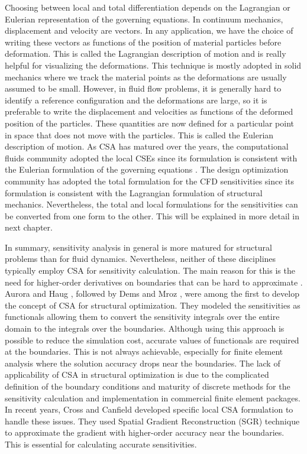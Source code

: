 Choosing between local and total differentiation depends on the Lagrangian or Eulerian representation of the governing equations. In continuum mechanics,  displacement and velocity are vectors. In any application, we have the choice of writing these vectors as functions of the position of material particles before deformation. This is called the Lagrangian description of motion and is really helpful for visualizing the deformations. This technique is mostly adopted in solid mechanics where we track the material points as the deformations are usually assumed to be small. However, in fluid flow problems, it is generally hard to identify a reference configuration and the deformations are large, so it is preferable to write the displacement and velocities as functions of the deformed position of the particles. These quantities are now defined for a particular point in space that does not move with the particles. This is called the Eulerian description of motion.  As CSA has matured over the years, the computational fluids community adopted the local CSEs since its formulation is consistent with the Eulerian formulation of the governing equations \cite{borggaard1997pde, hristova2006continuous}. The design optimization community has adopted the total formulation for the CFD sensitivities since its formulation is consistent with the Lagrangian formulation of structural mechanics. Nevertheless, the total and local formulations for the sensitivities can be converted from one form to the other. This will be explained in more detail in next chapter.

In summary, sensitivity analysis in general is more matured for structural problems than for fluid dynamics. Nevertheless, neither of these disciplines typically employ CSA for sensitivity calculation. The main reason for this is the need for higher-order derivatives on boundaries that can be hard to approximate \cite{cross2014local}. Aurora and Haug \cite{Arora}, followed by Dems and Mroz \cite{Dems-Mroz}, were among the first to develop the concept of CSA for structural optimization. They modeled the sensitivities as functionals allowing them to convert the sensitivity integrals over the entire domain to the integrals over the boundaries. Although using this approach is possible to reduce the simulation cost, accurate values of functionals are required at the boundaries. This is not always achievable, especially for finite element analysis where the solution accuracy drops near the boundaries. The lack of applicability of CSA in structural optimization is due to the complicated definition of the boundary conditions and maturity of discrete methods for the sensitivity calculation and implementation in commercial finite element packages. In recent years, Cross and Canfield \cite{cross2014local} developed specific local CSA formulation to handle these issues. They used Spatial Gradient Reconstruction (SGR) technique to approximate the gradient with higher-order accuracy near the boundaries. This is essential for calculating accurate sensitivities.

